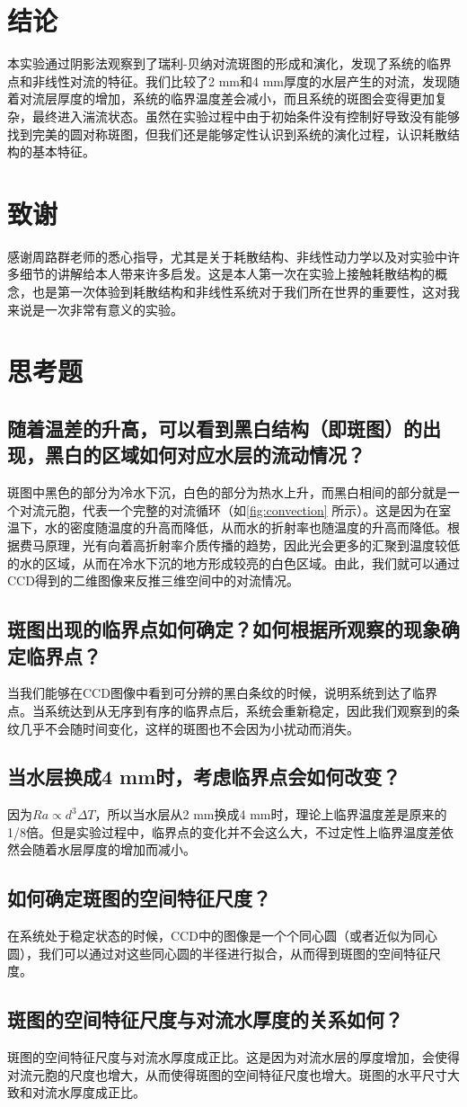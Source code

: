 \documentclass[font=default]{mpltx}
\begin{document}
\section{结论}
本实验通过阴影法观察到了瑞利-贝纳对流斑图的形成和演化，发现了系统的临界点和非线性对流的特征。我们比较了2 mm和4 mm厚度的水层产生的对流，发现随着对流层厚度的增加，系统的临界温度差会减小，而且系统的斑图会变得更加复杂，最终进入湍流状态。虽然在实验过程中由于初始条件没有控制好导致没有能够找到完美的圆对称斑图，但我们还是能够定性认识到系统的演化过程，认识耗散结构的基本特征。

\section{致谢}
感谢周路群老师的悉心指导，尤其是关于耗散结构、非线性动力学以及对实验中许多细节的讲解给本人带来许多启发。这是本人第一次在实验上接触耗散结构的概念，也是第一次体验到耗散结构和非线性系统对于我们所在世界的重要性，这对我来说是一次非常有意义的实验。

\appendix

\section{思考题}
\subsection{随着温差的升高，可以看到黑白结构（即斑图）的出现，黑白的区域如何对应水层的流动情况？}
斑图中黑色的部分为冷水下沉，白色的部分为热水上升，而黑白相间的部分就是一个对流元胞，代表一个完整的对流循环（如\autoref{fig:convection} 所示）。这是因为在室温下，水的密度随温度的升高而降低，从而水的折射率也随温度的升高而降低。根据费马原理，光有向着高折射率介质传播的趋势，因此光会更多的汇聚到温度较低的水的区域，从而在冷水下沉的地方形成较亮的白色区域。由此，我们就可以通过CCD得到的二维图像来反推三维空间中的对流情况。

\subsection{斑图出现的临界点如何确定？如何根据所观察的现象确定临界点？}
当我们能够在CCD图像中看到可分辨的黑白条纹的时候，说明系统到达了临界点。当系统达到从无序到有序的临界点后，系统会重新稳定，因此我们观察到的条纹几乎不会随时间变化，这样的斑图也不会因为小扰动而消失。

\subsection{当水层换成4 mm时，考虑临界点会如何改变？}
因为$Ra\propto d^3\Delta T$，所以当水层从2 mm换成4 mm时，理论上临界温度差是原来的1/8倍。但是实验过程中，临界点的变化并不会这么大，不过定性上临界温度差依然会随着水层厚度的增加而减小。

\subsection{如何确定斑图的空间特征尺度？}
在系统处于稳定状态的时候，CCD中的图像是一个个同心圆（或者近似为同心圆），我们可以通过对这些同心圆的半径进行拟合，从而得到斑图的空间特征尺度。

\subsection{斑图的空间特征尺度与对流水厚度的关系如何？}
斑图的空间特征尺度与对流水厚度成正比。这是因为对流水层的厚度增加，会使得对流元胞的尺度也增大，从而使得斑图的空间特征尺度也增大。斑图的水平尺寸大致和对流水厚度成正比。
\end{document}
